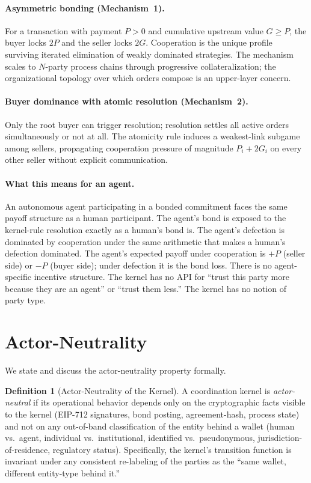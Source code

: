 \documentclass[11pt,a4paper]{article}
\theoremstyle{definition}
\newtheorem{definition}[theorem]{Definition}
\theoremstyle{remark}
\newcommand{\pay}{P}
\newcommand{\cumval}{G}
\begin{document}
\paragraph{Asymmetric bonding (Mechanism~1).}
For a transaction with payment $\pay > 0$ and cumulative upstream
value $\cumval \geq \pay$, the buyer locks $2\pay$ and the seller
locks $2\cumval$. Cooperation is the unique profile surviving
iterated elimination of weakly dominated strategies. The mechanism
scales to $N$-party process chains through progressive
collateralization; the organizational topology over which orders
compose is an upper-layer concern.

\paragraph{Buyer dominance with atomic resolution (Mechanism~2).}
Only the root buyer can trigger resolution; resolution settles
all active orders simultaneously or not at all. The atomicity rule
induces a weakest-link subgame among sellers, propagating
cooperation pressure of magnitude $\pay_i + 2\cumval_i$ on every
other seller without explicit communication.

\paragraph{What this means for an agent.}
An autonomous agent participating in a bonded commitment faces
the same payoff structure as a human participant. The agent's
bond is exposed to the kernel-rule resolution exactly as a human's
bond is. The agent's defection is dominated by cooperation under
the same arithmetic that makes a human's defection dominated. The
agent's expected payoff under cooperation is $+\pay$ (seller side)
or $-\pay$ (buyer side); under defection it is the bond loss.
There is no agent-specific incentive structure. The kernel has
no API for ``trust this party more because they are an agent''
or ``trust them less.'' The kernel has no notion of party type.

\section{Actor-Neutrality}
\label{sec:actor-neutrality}

We state and discuss the actor-neutrality property formally.

\begin{definition}[Actor-Neutrality of the Kernel]
\label{def:actor-neutrality}
A coordination kernel is \emph{actor-neutral} if its operational
behavior depends only on the cryptographic facts visible to the
kernel (EIP-712 signatures, bond posting, agreement-hash, process
state) and not on any out-of-band classification of the entity
behind a wallet (human vs.\ agent, individual vs.\ institutional,
identified vs.\ pseudonymous, jurisdiction-of-residence, regulatory
status). Specifically, the kernel's transition function is invariant
under any consistent re-labeling of the parties as the
``same wallet, different entity-type behind it.''
\end{definition}
\end{document}
